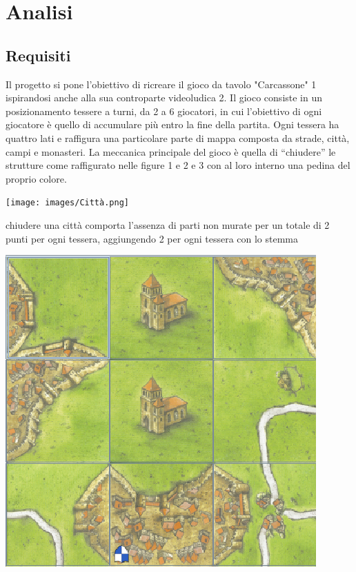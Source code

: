 \section{Analisi}
\subsection{Requisiti}

Il progetto si pone l'obiettivo di ricreare il gioco da tavolo "Carcassone" 1 ispirandosi anche alla sua controparte videoludica 2. Il gioco consiste in un posizionamento tessere a turni, da 2 a 6 giocatori, in cui l’obiettivo di ogni giocatore è quello di accumulare più entro la fine della partita. Ogni tessera ha quattro lati e raffigura una particolare parte di mappa composta da strade, città, campi e monasteri. La meccanica principale del gioco è quella di “chiudere” le strutture come raffigurato nelle figure 1 e 2 e 3 con al loro interno una pedina del proprio colore.

\vfill

        {\texttt{[image: images/Città.png]}}

\vfill

chiudere una città comporta l’assenza di parti non murate per un totale di 2 punti per ogni tessera, aggiungendo 2 per ogni tessera con lo stemma

\vfill

        {\includegraphics[scale=.42]{images/Monastero.png}}

